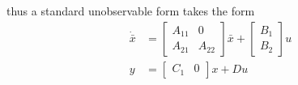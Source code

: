 \documentclass[twoside]{article}
\begin{document}
%
thus a standard unobservable form takes the form
%
\begin{align*}
\dot{\bar{x}} &= \left[ \begin{array}{c|c} A_{11} & 0 \\ \hline A_{21} & A_{22}  \end{array} \right] \bar{x} + \left[ \begin{array}{c} B_1 \\ B_2 \end{array} \right] u
\\
y &= \left[ \begin{array}{c|c} C_1 & 0 \end{array} \right] x + D u
\end{align*}


\end{document}
